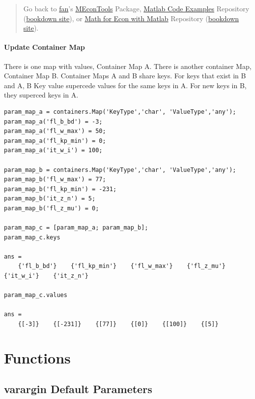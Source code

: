 \documentclass[
]{book}
\begin{document}
\begin{quote}
Go back to \href{http://fanwangecon.github.io/}{fan}'s \href{https://fanwangecon.github.io/MEconTools/}{MEconTools} Package, \href{https://fanwangecon.github.io/M4Econ/}{Matlab Code Examples} Repository (\href{https://fanwangecon.github.io/M4Econ/bookdown}{bookdown site}), or \href{https://fanwangecon.github.io/Math4Econ/}{Math for Econ with Matlab} Repository (\href{https://fanwangecon.github.io/Math4Econ/bookdown}{bookdown site}).
\end{quote}

\hypertarget{update-container-map}{%
\subsubsection{Update Container Map}\label{update-container-map}}

There is one map with values, Container Map A. There is another
container Map, Container Map B. Container Maps A and B share keys. For
keys that exist in B and A, B Key value supercede values for the same
keys in A. For new keys in B, they superced keys in A.

\begin{verbatim}
param_map_a = containers.Map('KeyType','char', 'ValueType','any');
param_map_a('fl_b_bd') = -3;
param_map_a('fl_w_max') = 50;
param_map_a('fl_kp_min') = 0;
param_map_a('it_w_i') = 100;

param_map_b = containers.Map('KeyType','char', 'ValueType','any');
param_map_b('fl_w_max') = 77;
param_map_b('fl_kp_min') = -231;
param_map_b('it_z_n') = 5;
param_map_b('fl_z_mu') = 0;

param_map_c = [param_map_a; param_map_b];
param_map_c.keys

ans = 
    {'fl_b_bd'}    {'fl_kp_min'}    {'fl_w_max'}    {'fl_z_mu'}    {'it_w_i'}    {'it_z_n'}

param_map_c.values

ans = 
    {[-3]}    {[-231]}    {[77]}    {[0]}    {[100]}    {[5]}
\end{verbatim}

\hypertarget{functions}{%
\chapter{Functions}\label{functions}}

\hypertarget{varargin-default-parameters}{%
\section{varargin Default Parameters}\label{varargin-default-parameters}}
\end{document}
